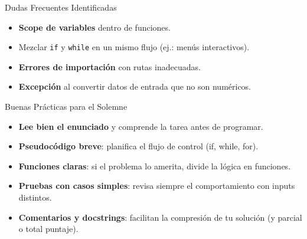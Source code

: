 \documentclass[10pt]{beamer}
\begin{document}
\begin{frame}{Dudas Frecuentes Identificadas}
  \begin{itemize}
    \item \textbf{Scope de variables} dentro de funciones.
    \item Mezclar \texttt{if} y \texttt{while} en un mismo flujo (ej.: menús interactivos).
    \item \textbf{Errores de importación} con rutas inadecuadas.
    \item \textbf{Excepción} al convertir datos de entrada que no son numéricos.
  \end{itemize}
\end{frame}

\begin{frame}{Buenas Prácticas para el Solemne}
  \begin{itemize}
    \item \textbf{Lee bien el enunciado} y comprende la tarea antes de programar.
    \item \textbf{Pseudocódigo breve}: planifica el flujo de control (if, while, for).
    \item \textbf{Funciones claras}: si el problema lo amerita, divide la lógica en funciones.
    \item \textbf{Pruebas con casos simples}: revisa siempre el comportamiento con inputs distintos.
    \item \textbf{Comentarios y docstrings}: facilitan la compresión de tu solución (y parcial o total puntaje).
  \end{itemize}
\end{frame}
\end{document}

